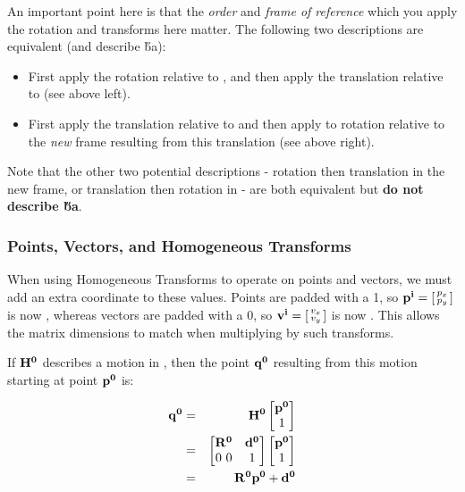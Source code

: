 \documentclass{16384_doc}
\begin{document}
An important point here is that the \emph{order} and \emph{frame of reference}
which you apply the rotation and transforms here matter. The following two
descriptions are equivalent (and describe \H{b}{a}):
\begin{itemize}
\item First apply the rotation relative to , and then apply the
translation relative to  (see above left).
\item First apply the translation relative to  and then apply to
rotation relative to the \emph{new} frame resulting from this translation (see
above right).
\end{itemize}

Note that the other two potential descriptions - rotation then translation in
the new frame, or translation then rotation in  - are both equivalent
but \textbf{do not describe \H{b}{a}}.

\subsubsection{Points, Vectors, and Homogeneous Transforms}

When using Homogeneous Transforms to operate on points and vectors, we must add
an extra coordinate to these values. Points are padded with a 1, so $\mathbf{p_{}^{i}} =
\left[\begin{smallmatrix}p_x\\p_y\end{smallmatrix}\right]$ is now , whereas vectors are padded with a 0,
so $\mathbf{v_{}^{i}} = \left[\begin{smallmatrix}v_x\\v_y\end{smallmatrix}\right]$ is now . This allows the
matrix dimensions to match when multiplying by such transforms.

If $\mathbf{H_{}^{0}}$ describes a motion in , then the point $\mathbf{q_{}^{0}}$
resulting from this motion starting at point $\mathbf{p_{}^{0}}$ is:

\begin{eqnarray*}
\mathbf{q_{}^{0}} &=& \mathbf{H_{}^{0}} \begin{bmatrix}\mathbf{p_{}^{0}}\\1\end{bmatrix} \\
&=& \begin{bmatrix}\mathbf{R_{}^{0}}&\mathbf{d_{}^{0}}\\0~0&1\end{bmatrix} \begin{bmatrix}\mathbf{p_{}^{0}}\\1\end{bmatrix} \\
&=& \mathbf{R_{}^{0}} \mathbf{p_{}^{0}} + \mathbf{d_{}^{0}} \\
\end{eqnarray*}
\end{document}
